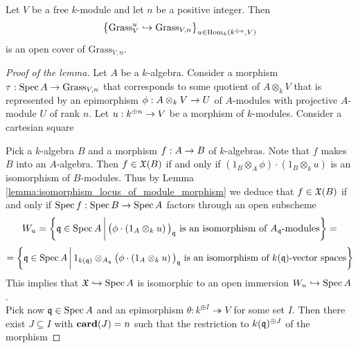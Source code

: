 \begin{lemma}\label{lemma:standard_open_cover_of_grassmannian}
Let $V$ be a free $k$-module and let $n$ be a positive integer. Then
$$\big\{\mathrm{Grass}_{V}^u\hookrightarrow \mathrm{Grass}_{V,n} \big\}_{u\in \mathrm{Hom}_k\left(k^{\oplus n},V\right)}$$
is an open cover of $\mathrm{Grass}_{V,n}$.
\end{lemma}
\begin{proof}[Proof of the lemma]
Let $A$ be a $k$-algebra. Consider a morphism $\tau:\mathrm{Spec}\, A\rightarrow \mathrm{Grass}_{V,n}$ that corresponds to some quotient of $A\otimes_kV$ that is represented by an epimorphism $\phi:A\otimes_kV\rightarrow U$ of $A$-modules with projective $A$-module $U$ of rank $n$. Let $u:k^{\oplus n}\rightarrow V$ be a morphism of $k$-modules. Consider a cartesian square
\begin{center}
\end{center}
Pick a $k$-algebra $B$ and a morphism $f:A\rightarrow B$ of $k$-algebras. Note that $f$ makes $B$ into an $A$-algebra. Then $f\in {\mathfrak X}(B)$ if and only if $\left(1_B\otimes_A\phi\right)\cdot \left(1_B\otimes_ku\right)$ is an isomorphism of $B$-modules. Thus by Lemma \ref{lemma:isomorphism_locus_of_module_morphism} we deduce that $f\in {\mathfrak X}(B)$ if and only if $\mathrm{Spec}\, f:\mathrm{Spec}\, B\rightarrow \mathrm{Spec}\, A$ factors through an open subscheme
$$W_u = \bigg\{\mathfrak{q}\in \mathrm{Spec}\, A\,\bigg|\,\big(\phi\cdot \left(1_A\otimes_ku\right)\big)_{\mathfrak{q}}\mbox{ is an isomorphism of }A_{\mathfrak{q}}\mbox{-modules}\bigg\} =$$
$$= \bigg\{\mathfrak{q}\in \mathrm{Spec}\, A\,\bigg|\,1_{k(\mathfrak{q})}\otimes_{A_{\mathfrak{q}}}\big(\phi\cdot \left(1_A\otimes_ku\right)\big)_{\mathfrak{q}}\mbox{ is an isomorphism of }k(\mathfrak{q})\mbox{-vector spaces}\bigg\}$$
This implies that ${\mathfrak X} \hookrightarrow \mathrm{Spec}\, A$ is isomorphic to an open immersion $W_u\hookrightarrow \mathrm{Spec}\, A$.\\
Pick now $\mathfrak{q}\in \mathrm{Spec}\, A$ and an epimorphism $\theta:k^{\oplus I}\twoheadrightarrow V$ for some set $I$. Then there exist $J\subseteq I$ with $\mathbf{card}(J) = n$ such that the restriction to $k(\mathfrak{q})^{\oplus J}$ of the morphism

\end{proof}
